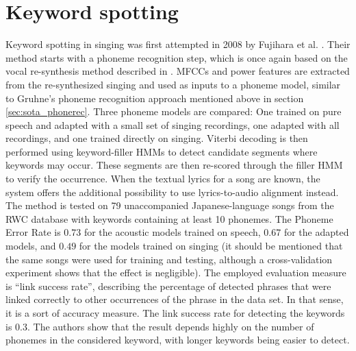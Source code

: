 \section{Keyword spotting}
Keyword spotting in singing was first attempted in 2008 by Fujihara et al. \cite{hyperlinking_lyrics}. Their method starts with a phoneme recognition step, which is once again based on the vocal re-synthesis method described in \cite{fujihara_identification}. MFCCs and power features are extracted from the re-synthesized singing and used as inputs to a phoneme model, similar to Gruhne's phoneme recognition approach mentioned above in section \ref{sec:sota_phonerec}.  Three phoneme models are compared: One trained on pure speech and adapted with a small set of singing recordings, one adapted with all recordings, and one trained directly on singing. Viterbi decoding is then performed using keyword-filler HMMs to detect candidate segments where keywords may occur. These segments are then re-scored through the filler HMM to verify the occurrence. When the textual lyrics for a song are known, the system offers the additional possibility to use lyrics-to-audio alignment instead.
The method is tested on 79 unaccompanied Japanese-language songs from the RWC database \cite{rwc} with keywords containing at least 10 phonemes. The Phoneme Error Rate is $0.73$ for the acoustic models trained on speech, $0.67$ for the adapted models, and $0.49$ for the models trained on singing (it should be mentioned that the same songs were used for training and testing, although a cross-validation experiment shows that the effect is negligible). The employed evaluation measure is ``link success rate'', describing the percentage of detected phrases that were linked correctly to other occurrences of the phrase in the data set. In that sense, it is a sort of accuracy measure. The link success rate for detecting the keywords is $0.3$. The authors show that the result depends highly on the number of phonemes in the considered keyword, with longer keywords being easier to detect.\\

